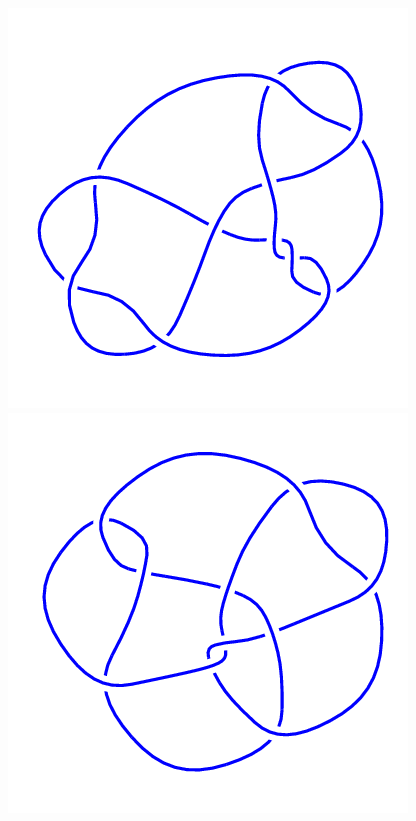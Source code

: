\begin{figure}[H]
\begin{minipage}[b]{.18\linewidth}
    \end{minipage}
    \begin{minipage}[b]{.18\linewidth}
        \centering
        \includegraphics[width=\linewidth]{../data/10_144.png}
    \end{minipage}
    \begin{minipage}[b]{.18\linewidth}
        \centering
        \includegraphics[width=\linewidth]{../data/10_145.png}

\end{minipage}
\end{figure}
